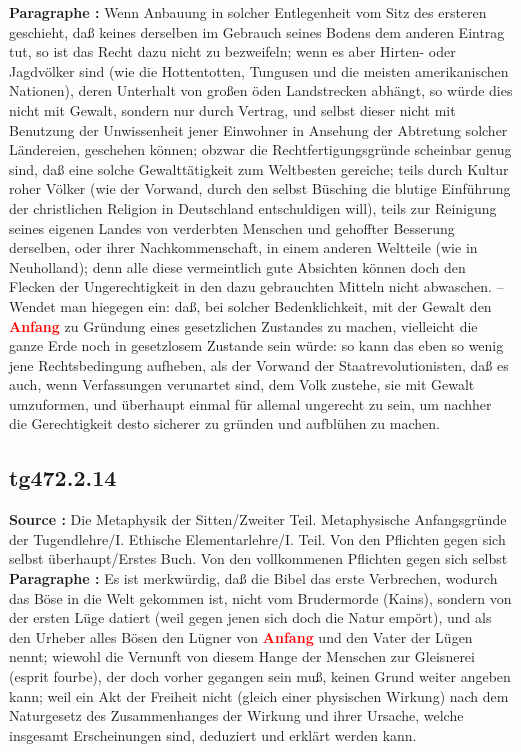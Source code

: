 \documentclass[a4paper,12pt,twoside]{book}
\newcommand{\match}[1]{\textcolor{red}{\textbf{#1}}}
\begin{document}
	\textbf{Paragraphe : }Wenn Anbauung in solcher Entlegenheit vom Sitz des ersteren geschieht, daß keines derselben im Gebrauch seines Bodens dem anderen Eintrag tut, so ist das Recht dazu nicht zu bezweifeln; wenn es aber Hirten- oder Jagdvölker  sind (wie die Hottentotten, Tungusen und die meisten amerikanischen Nationen), deren Unterhalt von großen öden Landstrecken abhängt, so würde dies nicht mit Gewalt, sondern nur durch Vertrag, und selbst dieser nicht mit Benutzung der Unwissenheit jener Einwohner in Ansehung der Abtretung solcher Ländereien, geschehen können; obzwar die Rechtfertigungsgründe scheinbar genug sind, daß eine solche Gewalttätigkeit zum Weltbesten gereiche; teils durch Kultur roher Völker (wie der Vorwand, durch den selbst Büsching die blutige Einführung der christlichen Religion in Deutschland entschuldigen will), teils zur Reinigung seines eigenen Landes von verderbten Menschen und gehoffter Besserung derselben, oder ihrer Nachkommenschaft, in einem anderen Weltteile (wie in Neuholland); denn alle diese vermeintlich gute Absichten können doch den Flecken der Ungerechtigkeit in den dazu gebrauchten Mitteln nicht abwaschen. – Wendet man hiegegen ein: daß, bei solcher Bedenklichkeit, mit der Gewalt den \match{Anfang} zu Gründung eines gesetzlichen Zustandes zu machen, vielleicht die ganze Erde noch in gesetzlosem Zustande sein würde: so kann das eben so wenig jene Rechtsbedingung aufheben, als der Vorwand der Staatrevolutionisten, daß es auch, wenn Verfassungen verunartet sind, dem Volk zustehe, sie mit Gewalt umzuformen, und überhaupt einmal für allemal ungerecht zu sein, um nachher die Gerechtigkeit desto sicherer zu gründen und aufblühen zu machen. 
	
	\subsection*{tg472.2.14} 
	\textbf{Source : }Die Metaphysik der Sitten/Zweiter Teil. Metaphysische Anfangsgründe der Tugendlehre/I. Ethische Elementarlehre/I. Teil. Von den Pflichten gegen sich selbst überhaupt/Erstes Buch. Von den vollkommenen Pflichten gegen sich selbst\\  
	
	\textbf{Paragraphe : }Es ist merkwürdig, daß die Bibel das erste Verbrechen, wodurch das Böse in die Welt gekommen ist, nicht vom Brudermorde (Kains), sondern von der ersten Lüge datiert (weil gegen jenen sich doch die Natur empört), und als den Urheber alles Bösen den Lügner von \match{Anfang} und den Vater der Lügen nennt; wiewohl die Vernunft von diesem Hange der Menschen zur Gleisnerei (esprit fourbe), der  doch vorher gegangen sein muß, keinen Grund weiter angeben kann; weil ein Akt der Freiheit nicht (gleich einer physischen Wirkung) nach dem Naturgesetz des Zusammenhanges der Wirkung und ihrer Ursache, welche insgesamt Erscheinungen sind, deduziert und erklärt werden kann. 
	
\end{document}
